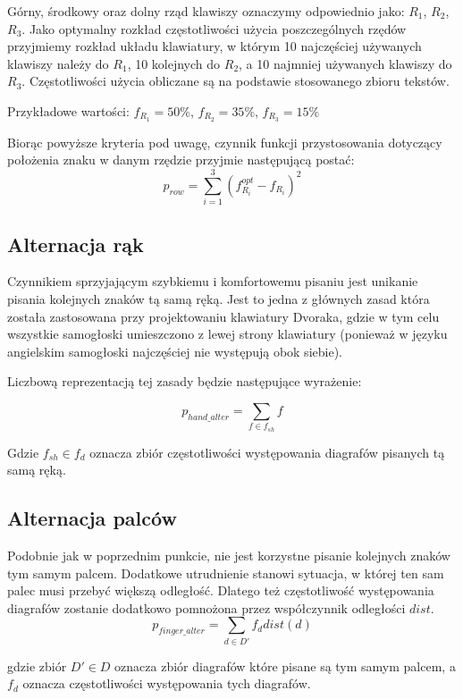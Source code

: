 \documentclass[brudnopis]{xmgr}
\begin{document}
Górny, środkowy oraz dolny rząd klawiszy oznaczymy odpowiednio jako: $R_1$, $R_2$, $R_3$. Jako optymalny rozkład częstotliwości użycia poszczególnych rzędów przyjmiemy rozkład układu klawiatury, w którym 10 najczęściej używanych klawiszy należy do $R_1$, 10 kolejnych do $R_2$, a 10 najmniej używanych klawiszy do $R_3$. Częstotliwości użycia obliczane są na podstawie stosowanego zbioru tekstów.

Przykładowe wartości: $f_{R_1} = 50\%$, $f_{R_2} = 35\%$, $f_{R_3} = 15\%$

Biorąc powyższe kryteria pod uwagę, czynnik funkcji przystosowania dotyczący położenia znaku w danym rzędzie przyjmie następującą postać:
$$ p_{row} = \sum\limits_{i = 1}^{3} (f_{R_i}^{opt} - f_{R_i})^2 $$


\subsection{Alternacja rąk}

Czynnikiem sprzyjającym szybkiemu i komfortowemu pisaniu jest unikanie pisania kolejnych znaków tą samą ręką. Jest to jedna z głównych zasad która została zastosowana przy projektowaniu klawiatury Dvoraka, gdzie w tym celu wszystkie samogłoski umieszczono z lewej strony klawiatury (ponieważ w języku angielskim samogłoski najczęściej nie występują obok siebie).

Liczbową reprezentacją tej zasady będzie następujące wyrażenie:

$$ p_{hand\_alter} = \sum\limits_{f \in f_{sh}} f $$

Gdzie $ f_{sh} \in f_d $ oznacza zbiór częstotliwości występowania diagrafów pisanych tą samą ręką.


\subsection{Alternacja palców}

Podobnie jak w poprzednim punkcie, nie jest korzystne pisanie kolejnych znaków tym samym palcem. Dodatkowe utrudnienie stanowi sytuacja, w której ten sam palec musi przebyć większą odległość. Dlatego też częstotliwość występowania diagrafów zostanie dodatkowo pomnożona przez współczynnik odległości $dist$.
$$ p_{finger\_alter} = \sum\limits_{d \in D'} f_d dist(d) $$

\noindent
gdzie zbiór $ D' \in D $ oznacza zbiór diagrafów które pisane są tym samym palcem, a $f_d$ oznacza częstotliwości występowania tych diagrafów.\newline
\end{document}
